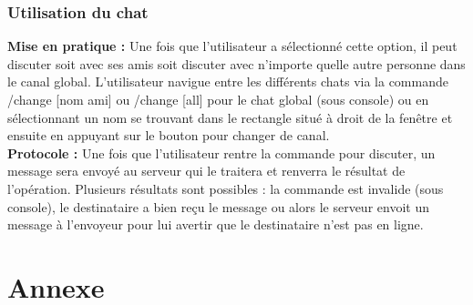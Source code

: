 \documentclass[10pt, a4paper]{article}
\begin{document}
\subsubsection{Utilisation du chat}
\textbf{Mise en pratique :} Une fois que l'utilisateur a sélectionné cette option, il peut discuter soit avec ses amis soit discuter avec n'importe quelle autre personne dans le canal global. L'utilisateur navigue entre les différents chats via la commande /change [nom ami] ou /change [all] pour le chat global (sous console) ou en sélectionnant un nom se trouvant dans le rectangle situé à droit de la fenêtre et ensuite en appuyant sur le bouton pour changer de canal. \\
\textbf{Protocole :} Une fois que l'utilisateur rentre la commande pour discuter, un message sera envoyé au serveur qui le traitera et renverra le résultat de l'opération. Plusieurs résultats sont possibles : la commande est invalide (sous console), le destinataire a bien reçu le message ou alors le serveur envoit un message à l'envoyeur pour lui avertir que le destinataire n'est pas en ligne. \\



\section{Annexe}
\end{document}
